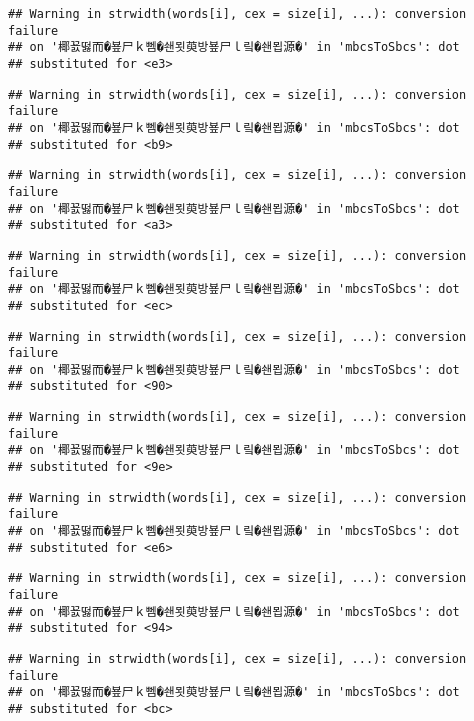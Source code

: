 \documentclass[]{article}
\begin{document}
\begin{verbatim}
## Warning in strwidth(words[i], cex = size[i], ...): conversion failure
## on '椰꾨떯而�뵾尸ｋ뻼�쇈묏萸방뵾尸ｌ맄�쇈묍源�' in 'mbcsToSbcs': dot
## substituted for <e3>
\end{verbatim}

\begin{verbatim}
## Warning in strwidth(words[i], cex = size[i], ...): conversion failure
## on '椰꾨떯而�뵾尸ｋ뻼�쇈묏萸방뵾尸ｌ맄�쇈묍源�' in 'mbcsToSbcs': dot
## substituted for <b9>
\end{verbatim}

\begin{verbatim}
## Warning in strwidth(words[i], cex = size[i], ...): conversion failure
## on '椰꾨떯而�뵾尸ｋ뻼�쇈묏萸방뵾尸ｌ맄�쇈묍源�' in 'mbcsToSbcs': dot
## substituted for <a3>
\end{verbatim}

\begin{verbatim}
## Warning in strwidth(words[i], cex = size[i], ...): conversion failure
## on '椰꾨떯而�뵾尸ｋ뻼�쇈묏萸방뵾尸ｌ맄�쇈묍源�' in 'mbcsToSbcs': dot
## substituted for <ec>
\end{verbatim}

\begin{verbatim}
## Warning in strwidth(words[i], cex = size[i], ...): conversion failure
## on '椰꾨떯而�뵾尸ｋ뻼�쇈묏萸방뵾尸ｌ맄�쇈묍源�' in 'mbcsToSbcs': dot
## substituted for <90>
\end{verbatim}

\begin{verbatim}
## Warning in strwidth(words[i], cex = size[i], ...): conversion failure
## on '椰꾨떯而�뵾尸ｋ뻼�쇈묏萸방뵾尸ｌ맄�쇈묍源�' in 'mbcsToSbcs': dot
## substituted for <9e>
\end{verbatim}

\begin{verbatim}
## Warning in strwidth(words[i], cex = size[i], ...): conversion failure
## on '椰꾨떯而�뵾尸ｋ뻼�쇈묏萸방뵾尸ｌ맄�쇈묍源�' in 'mbcsToSbcs': dot
## substituted for <e6>
\end{verbatim}

\begin{verbatim}
## Warning in strwidth(words[i], cex = size[i], ...): conversion failure
## on '椰꾨떯而�뵾尸ｋ뻼�쇈묏萸방뵾尸ｌ맄�쇈묍源�' in 'mbcsToSbcs': dot
## substituted for <94>
\end{verbatim}

\begin{verbatim}
## Warning in strwidth(words[i], cex = size[i], ...): conversion failure
## on '椰꾨떯而�뵾尸ｋ뻼�쇈묏萸방뵾尸ｌ맄�쇈묍源�' in 'mbcsToSbcs': dot
## substituted for <bc>
\end{verbatim}
\end{document}
